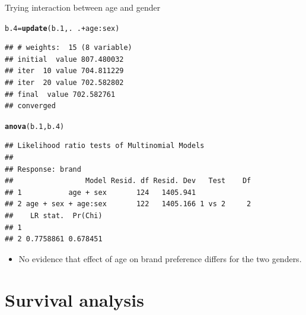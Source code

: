 \documentclass[unknownkeysallowed]{beamer}\usepackage[]{graphicx}\usepackage[]{color}
\makeatletter
\newcommand{\hlopt}[1]{\textcolor[rgb]{0,0,0}{#1}}%
\newcommand{\hlstd}[1]{\textcolor[rgb]{0.345,0.345,0.345}{#1}}%
\newcommand{\hlkwb}[1]{\textcolor[rgb]{0.69,0.353,0.396}{#1}}%
\newcommand{\hlkwd}[1]{\textcolor[rgb]{0.737,0.353,0.396}{\textbf{#1}}}%
\newenvironment{kframe}{%
 \def\at@end@of@kframe{}%
 \ifinner\ifhmode%
  \def\at@end@of@kframe{\end{minipage}}%
  \begin{minipage}{\columnwidth}%
 \fi\fi%
 \def\FrameCommand##1{\hskip\@totalleftmargin \hskip-\fboxsep
 \colorbox{shadecolor}{##1}\hskip-\fboxsep
     \hskip-\linewidth \hskip-\@totalleftmargin \hskip\columnwidth}%
 \MakeFramed {\advance\hsize-\width
   \@totalleftmargin\z@ \linewidth\hsize
   \@setminipage}}%
 {\par\unskip\endMakeFramed%
 \at@end@of@kframe}
\newenvironment{knitrout}{}{} %
\makeatother
\begin{document}
\begin{frame}[fragile]{Trying interaction between age and gender}


  \begin{scriptsize}
\begin{knitrout}
\color{fgcolor}\begin{kframe}
\begin{alltt}
\hlstd{b.4}\hlkwb{=}\hlkwd{update}\hlstd{(b.1,.}\hlopt{~}\hlstd{.}\hlopt{+}\hlstd{age}\hlopt{:}\hlstd{sex)}
\end{alltt}
\begin{verbatim}
## # weights:  15 (8 variable)
## initial  value 807.480032 
## iter  10 value 704.811229
## iter  20 value 702.582802
## final  value 702.582761 
## converged
\end{verbatim}
\begin{alltt}
\hlkwd{anova}\hlstd{(b.1,b.4)}
\end{alltt}
\begin{verbatim}
## Likelihood ratio tests of Multinomial Models
## 
## Response: brand
##                 Model Resid. df Resid. Dev   Test    Df
## 1           age + sex       124   1405.941             
## 2 age + sex + age:sex       122   1405.166 1 vs 2     2
##    LR stat.  Pr(Chi)
## 1                   
## 2 0.7758861 0.678451
\end{verbatim}
\end{kframe}
\end{knitrout}
    
  \end{scriptsize}

  \begin{itemize}
  \item No evidence that effect of age on brand preference differs for
    the two genders.
  \end{itemize}
  
\end{frame}


\section{Survival analysis}
\frame{\sectionpage}
\end{document}

